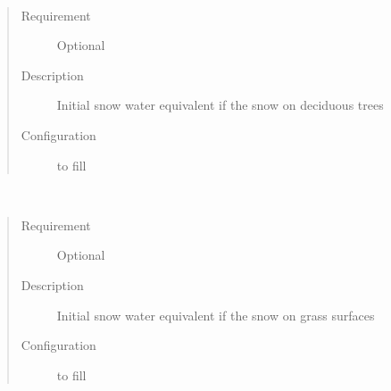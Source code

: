 \documentclass[letterpaper,10pt,english]{sphinxmanual}
\begin{document}

\begin{fulllineitems}
\label{\detokenize{input_files/Initial_Conditions/Snow_related_parameters:cmdoption-arg-snowpackdectr}}~\begin{quote}\begin{description}
\item[{Requirement}] \leavevmode
Optional

\item[{Description}] \leavevmode
Initial snow water equivalent if the snow on deciduous trees

\item[{Configuration}] \leavevmode
to fill

\end{description}\end{quote}

\end{fulllineitems}


\begin{fulllineitems}
\label{\detokenize{input_files/Initial_Conditions/Snow_related_parameters:cmdoption-arg-snowpackgrass}}~\begin{quote}\begin{description}
\item[{Requirement}] \leavevmode
Optional

\item[{Description}] \leavevmode
Initial snow water equivalent if the snow on grass surfaces

\item[{Configuration}] \leavevmode
to fill

\end{description}\end{quote}

\end{fulllineitems}

\end{document}
